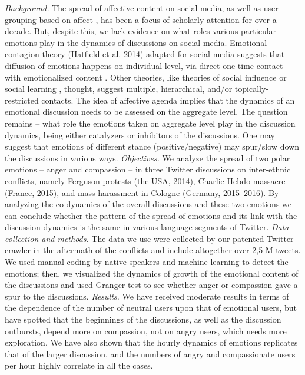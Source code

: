 \textit{Background.} The spread of affective content on social media, as well as user grouping based on affect \cite{Papacharissi}, has been a focus of scholarly attention for over a decade. But, despite this, we lack evidence on what roles various particular emotions play in the dynamics of discussions on social media. Emotional contagion theory (Hatfield et al. 2014) adapted for social media suggests that diffusion of emotions happens on individual level, via direct one-time contact with emotionalized content \cite{CovielloSohnKramer}. Other theories, like theories of social influence or social learning \cite{Young}, thought, suggest multiple, hierarchical, and/or topically-restricted contacts. The idea of affective agenda \cite{ColemanWu} implies that the dynamics of an emotional discussion needs to be assessed on the aggregate level. The question remains -- what role the emotions taken on aggregate level play in the discussion dynamics, being either catalyzers or inhibitors of the discussions. One may suggest that emotions of different stance (positive/negative) may spur/slow down the discussions in various ways. \textit{Objectives.} We analyze the spread of two polar emotions -- anger and compassion -- in three Twitter discussions on inter-ethnic conflicts, namely Ferguson protests (the USA, 2014), Charlie Hebdo massacre (France, 2015), and mass harassment in Cologne (Germany, 2015--2016). By analyzing the co-dynamics of the overall discussions and these two emotions we can conclude whether the pattern of the spread of emotions and its link with the discussion dynamics is the same in various language segments of Twitter. \textit{Data collection and methods.} The data we use were collected by our patented Twitter crawler in the aftermath of the conflicts and include altogether over 2,5 M tweets. We used manual coding by native speakers and machine learning to detect the emotions; then, we visualized the dynamics of growth of the emotional content of the discussions and used Granger test to see whether anger or compassion gave a spur to the discussions. \textit{Results.} We have received moderate results in terms of the dependence of the number of neutral users upon that of emotional users, but have spotted that the beginnings of the discussions, as well as the discussion outbursts, depend more on compassion, not on angry users, which needs more exploration. We have also shown that the hourly dynamics of emotions replicates that of the larger discussion, and the numbers of angry and compassionate users per hour highly correlate in all the cases.

